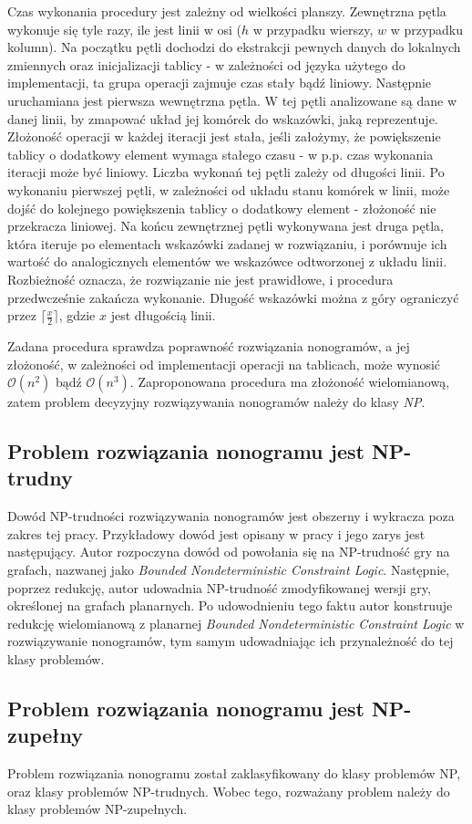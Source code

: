     Czas wykonania procedury jest zależny od wielkości planszy. Zewnętrzna pętla wykonuje się
tyle razy, ile jest linii w osi ($h$ w przypadku wierszy, $w$ w przypadku kolumn). Na początku pętli
dochodzi do ekstrakcji pewnych danych do lokalnych zmiennych oraz inicjalizacji tablicy - w zależności
od języka użytego do implementacji, ta grupa operacji zajmuje czas stały bądź liniowy. Następnie
uruchamiana jest pierwsza wewnętrzna pętla. W tej pętli analizowane są dane w danej linii, by zmapować
układ jej komórek do wskazówki, jaką reprezentuje. Złożoność operacji w każdej iteracji jest stała,
jeśli założymy, że powiększenie tablicy o dodatkowy element wymaga stałego czasu - w p.p. czas wykonania
iteracji może być liniowy. Liczba wykonań tej pętli zależy od długości linii.
Po wykonaniu pierwszej pętli, w zależności od układu stanu komórek w linii,
może dojść do kolejnego powiększenia tablicy o dodatkowy element - złożoność nie przekracza liniowej.
Na końcu zewnętrznej pętli wykonywana jest druga pętla, która iteruje po elementach wskazówki zadanej
w rozwiązaniu, i porównuje ich wartość do analogicznych elementów we wskazówce odtworzonej z układu linii.
Rozbieżność oznacza, że rozwiązanie nie jest prawidłowe, i procedura przedwcześnie zakańcza wykonanie.
Długość wskazówki można z góry ograniczyć przez $\lceil \frac{x}{2} \rceil$, gdzie $x$ jest długością
linii.

    Zadana procedura sprawdza poprawność rozwiązania nonogramów, a jej złożoność, w zależności od
implementacji operacji na tablicach, może wynosić $\mathcal{O}(n^2)$ bądź $\mathcal{O}(n^3)$.
Zaproponowana procedura ma złożoność wielomianową, zatem problem decyzyjny rozwiązywania nonogramów
należy do klasy \textit{NP}.


\subsection{Problem rozwiązania nonogramu jest NP-trudny}
    Dowód NP-trudności rozwiązywania nonogramów jest obszerny i wykracza poza zakres tej pracy.
Przykładowy dowód jest opisany w pracy \cite{Nonograms-NP-Hard} i jego zarys jest następujący.
Autor rozpoczyna dowód od powołania się na NP-trudność gry na grafach, nazwanej jako
\textit{Bounded Nondeterministic Constraint Logic}. Następnie, poprzez redukcję, autor udowadnia 
NP-trudność zmodyfikowanej wersji gry, określonej na grafach planarnych. Po udowodnieniu tego faktu
autor konstruuje redukcję wielomianową z planarnej \textit{Bounded Nondeterministic Constraint Logic}
w rozwiązywanie nonogramów, tym samym udowadniając ich przynależność do tej klasy problemów.


\subsection{Problem rozwiązania nonogramu jest NP-zupełny}
    Problem rozwiązania nonogramu został zaklasyfikowany do klasy problemów NP, oraz klasy problemów
NP-trudnych. Wobec tego, rozważany problem należy do klasy problemów NP-zupełnych.
